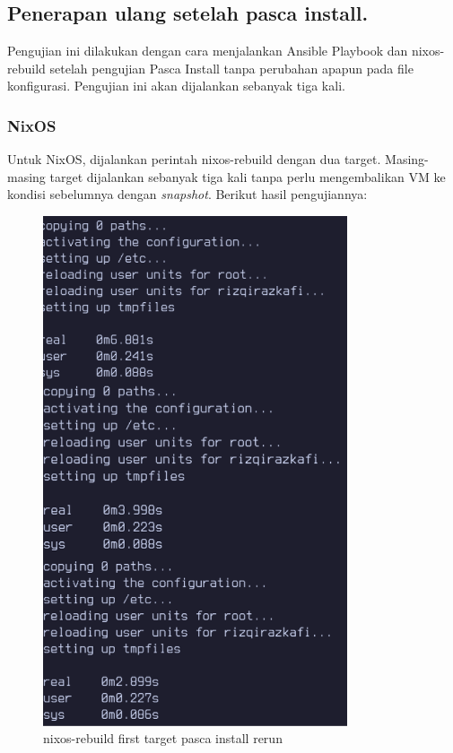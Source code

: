 \documentclass[10pt,twoside]{report}
\begin{document}
\begin{adjustwidth}{20pt}{}
	\subsection{Penerapan ulang setelah pasca install.}
	\begin{adjustwidth}{20pt}{}
		Pengujian ini dilakukan dengan cara menjalankan Ansible Playbook dan nixos-rebuild
		setelah pengujian Pasca Install tanpa perubahan apapun pada file konfigurasi. Pengujian ini
		akan dijalankan sebanyak tiga kali.
	\end{adjustwidth}
	\subsubsection{NixOS}
	\begin{adjustwidth}{20pt}{}
		Untuk NixOS, dijalankan perintah nixos-rebuild dengan dua target. Masing-masing target
		dijalankan sebanyak tiga kali tanpa perlu mengembalikan VM ke kondisi sebelumnya dengan
		\textit{snapshot}. Berikut hasil pengujiannya:
		\begin{figure}[H]
			\begin{center}
				\includegraphics[width=0.8\textwidth]{images/nix-target/nix-rerun-25-com.png}
			\end{center}
			\caption{nixos-rebuild first target pasca install rerun}
		\end{figure}


\end{adjustwidth}
\end{adjustwidth}
\end{document}
